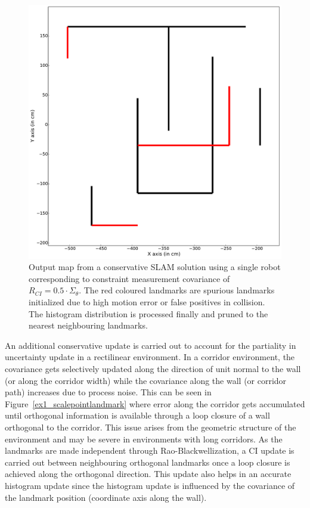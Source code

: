 \begin{figure}
\centering
\includegraphics[scale=0.25]{./images/single_map}
\caption[Output map from a conservative SLAM solution using a single robot]{Output map from a conservative SLAM solution using a single robot corresponding to constraint measurement covariance of $R_{CI}=0.5\cdot\Sigma_{\theta}$. The red coloured landmarks are spurious landmarks initialized due to high motion error or false positives in collision. The histogram distribution is processed finally and pruned to the nearest neighbouring landmarks.}
\label{single_map}
\end{figure} 

An additional conservative update is carried out to account for the partiality in uncertainty update in a rectilinear environment. In a corridor environment, the covariance gets selectively updated along the direction of unit normal to the wall (or along the corridor width) while the covariance along the wall (or corridor path) increases due to process noise. This can be seen in Figure~\ref{ex1_scalepointlandmark} where error along the corridor gets accumulated until orthogonal information is available through a loop closure of a wall orthogonal to the corridor. This issue arises from the geometric structure of the environment and may be severe in environments with long corridors. As the landmarks are made independent through Rao-Blackwellization, a CI update is carried out between neighbouring orthogonal landmarks once a loop closure is achieved along the orthogonal direction. This update also helps in an accurate histogram update since the histogram update is influenced by the covariance of the landmark position (coordinate axis along the wall).

